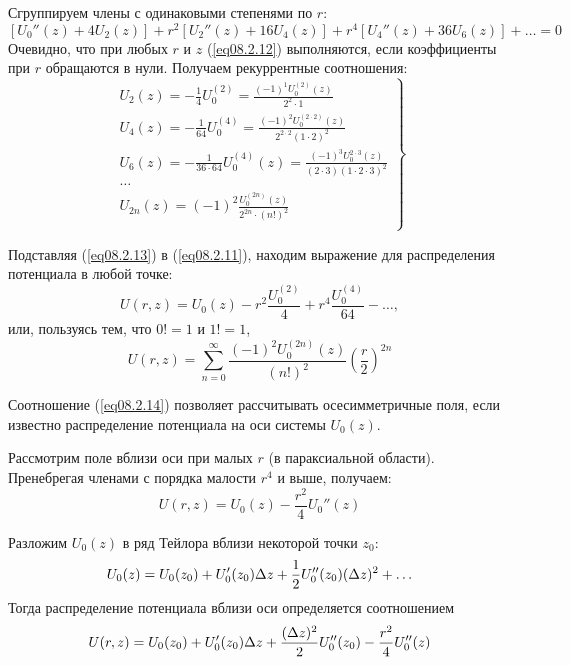 Сгруппируем члены с одинаковыми степенями по \( r \):
\begin{equation}
	\left[ U_0''(z) + 4U_2(z) \right] + r^2\left[ U_2''(z) + 16U_4(z)\right] + 
		r^4\left[ U_4''(z) + 36U_6(z) \right] + \ldots = 0
	\label{eq08.2.12}
\end{equation}
Очевидно, что при любых \( r \) и \( z \) (\ref{eq08.2.12}) выполняются, если 
коэффициенты при \( r \) обращаются в нули. Получаем рекуррентные соотношения:
\begin{equation}
	\left. \begin{array}{c}
		U_2(z) = -\frac{1}{4}U_0^{(2)} = \frac{(-1)^1 U_0^{(2)}(z)}{2^2\cdot1} \\
		U_4(z) = -\frac{1}{64}U_0^{(4)} = 
			\frac{(-1)^2 U_0^{(2\cdot2)}(z)}{2^{2\cdot2}(1\cdot2)^2} \\
		U_6(z) = -\frac{1}{36\cdot64}U_0^{(4)}(z) = 
			\frac{(-1)^3 U_0^{2\cdot3}(z)}{(2\cdot3)(1\cdot2\cdot3)^2} \\
		\ldots \\
		U_{2n}(z) = (-1)^2\frac{U_0^{(2n)}(z)}{2^{2n}\cdot(n!)^2} \\
	\end{array} \right\}
	\label{eq08.2.13}
\end{equation}

Подставляя (\ref{eq08.2.13}) в (\ref{eq08.2.11}), находим выражение для 
распределения потенциала в любой точке: 
\[
	U(r,z) = U_0(z) - r^2 \frac{U_0^{(2)}}{4} + r^4 \frac{U_0^{(4)}}{64} - 
		\ldots,
\]
или, пользуясь тем, что \( 0! = 1 \) и \( 1! = 1 \), 
\begin{equation}
	U(r,z) = \sum\limits_{n=0}^{\infty}\frac{(-1)^2U_0^{(2n)}(z)}{(n!)^2}
		\left( \frac{r}{2} \right)^{2n}
	\label{eq08.2.14}
\end{equation}

Соотношение (\ref{eq08.2.14}) позволяет рассчитывать осесимметричные поля, 
если известно распределение потенциала на оси системы \( U_0(z) \).

Рассмотрим поле вблизи оси при малых \( r \) (в параксиальной области). 
Пренебрегая членами с порядка малости \( r^4 \) и выше, получаем:
\[
	U(r,z) = U_0(z) - \frac{r^2}{4}U_0''(z)
\]

Разложим \( U_0(z) \) в ряд Тейлора вблизи некоторой точки \( z_0 \):
\[
	U_0(z) = U_0(z_0) + U_0'(z_0)\Delta z + \frac{1}{2}U_0''(z_0)(\Delta z)^2 + \ldots
\]
Тогда распределение потенциала вблизи оси определяется соотношением
\begin{equation}
	U(r,z) = U_0(z_0) + U_0'(z_0)\Delta z + \frac{(\Delta z)^2}{2} U_0''(z_0) - 
		\frac{r^2}{4}U_0''(z)
	\label{eq08.2.16}
\end{equation}